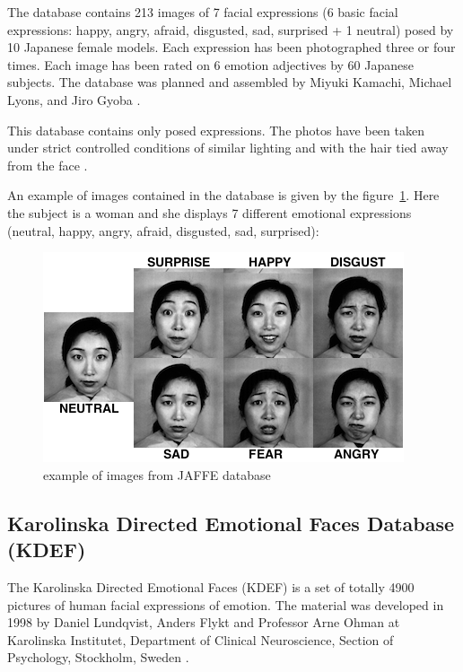 \vspace{\baselineskip}
\noindent The database contains 213 images of 7 facial expressions (6 basic facial expressions: happy, angry, afraid, disgusted, sad, surprised + 1 neutral) posed by 10 Japanese female models. Each expression has been photographed three or four times. Each image has been rated on 6 emotion adjectives by 60 Japanese subjects. The database was planned and assembled by Miyuki Kamachi, Michael Lyons, and Jiro Gyoba \cite{JAFFE}.
\newline

\noindent This database contains only posed expressions. The photos have been taken under strict controlled conditions of similar lighting and with the hair tied away from the face \cite{BET12}. 
\newline

\noindent An example of images contained in the database is given by the figure~\ref{jaffe_7facialexpressions}. Here the subject is a woman and she displays 7 different emotional expressions (neutral, happy, angry, afraid, disgusted, sad, surprised): 
\newline

\begin{figure}[!h]
\begin{center}
\noindent \includegraphics[scale=0.8]{figures/jaffe_7facialexpressions} 
\newline
\caption{example of images from JAFFE database}
\label{jaffe_7facialexpressions}
\end{center} 
\end{figure}

\subsection{Karolinska Directed Emotional Faces Database (KDEF)}

\vspace{\baselineskip}
\noindent The Karolinska Directed Emotional Faces (KDEF) is a set of totally 4900 pictures of human facial expressions of emotion. The material was developed in 1998 by Daniel Lundqvist, Anders Flykt and Professor Arne Ohman at Karolinska Institutet, Department of Clinical Neuroscience, Section of Psychology, Stockholm, Sweden \cite{KDEF}.
\newline

